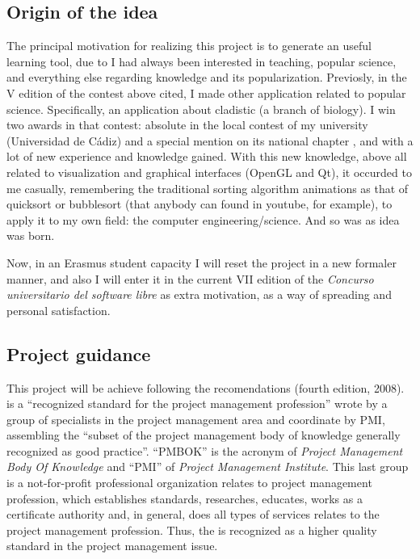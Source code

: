 \documentclass[twocolumn]{article}
\begin{document}
\subsection{Origin of the idea}
The principal motivation for realizing this project is to generate an
useful learning tool, due to I had always been interested in teaching,
popular science, and everything else regarding knowledge and its
popularization. Previosly, in the V edition of the contest above
cited, I made other application related
to popular science. Specifically, an application about cladistic (a branch
of biology). I win two awards in that contest: absolute in
the local contest of my university (Universidad de Cádiz) and a
special mention on its national chapter
, and with a lot of new experience and knowledge
gained. With this new knowledge, above all related to visualization
and graphical interfaces (OpenGL and Qt), it occurded to me casually,
remembering the traditional sorting algorithm animations as that of
quicksort or bubblesort (that anybody can found in youtube, for
example), to apply it to my own field: the computer
engineering/science. And so was as \fav idea was born.

Now, in an Erasmus student capacity I will reset the project in a new
formaler manner, and also I will enter it in the current VII
edition of the \textit{Concurso universitario del software libre} as
extra motivation, as a way of spreading and personal satisfaction.

\subsection{Project guidance}
This project will be achieve following the \pmbok
recomendations (fourth edition, 2008). \pmbok is a ``recognized
standard for the
project management profession'' wrote by a group of specialists in the
project management area and coordinate by PMI, assembling the ``subset of
the project management body of knowledge generally recognized as good
practice''. ``PMBOK'' is the acronym of \textit{Project Management
  Body Of Knowledge} and ``PMI'' of \textit{Project Management
  Institute}. This last group is a not-for-profit professional
organization relates to project management profession, which
establishes standards, researches, educates, works as a certificate
authority and, in general, does all types of services relates to the
project management profession. Thus, the \pmbok is recognized as
a higher quality standard in the project management issue.
\end{document}
